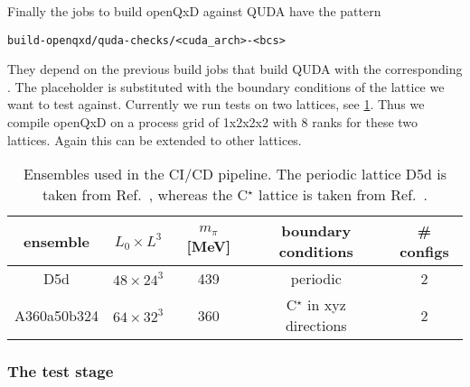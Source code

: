 Finally the jobs to build openQxD against QUDA have the pattern
\begin{verbatim}
build-openqxd/quda-checks/<cuda_arch>-<bcs>
\end{verbatim}
They depend on the previous build jobs that build QUDA with the corresponding . The placeholder  is substituted with the boundary conditions of the lattice we want to test against. Currently we run tests on two lattices, see \cref{tab:cicd:ensembles}. Thus we compile openQxD on a process grid of 1x2x2x2 with 8 ranks for these two lattices. Again this can be extended to other lattices.

\begin{table}[t]
  \centering
  \begin{tabular}{ccccc}
    \toprule
    {ensemble}&
    {$L_0 \times L^3$}&
    {$m_{\pi}$ [MeV]}&
    {boundary conditions}&
    {\# configs} \\
    \midrule
    D5d         & $48 \times 24^3$ & 439 & periodic    & 2 \\
    A360a50b324 & $64 \times 32^3$ & 360 & C$^{\star}$ in xyz directions & 2 \\
    \bottomrule
  \end{tabular}
  \caption{\label{tab:cicd:ensembles}%
    Ensembles used in the CI/CD pipeline. The periodic lattice D5d is taken from Ref.~\cite{online:cls}, whereas the C$^{\star}$ lattice is taken from Ref.~\cite{RCstar22}.}
\end{table}

\subsubsection{The test stage}
\label{sec:cicd:pipeline:gitlab:test}

